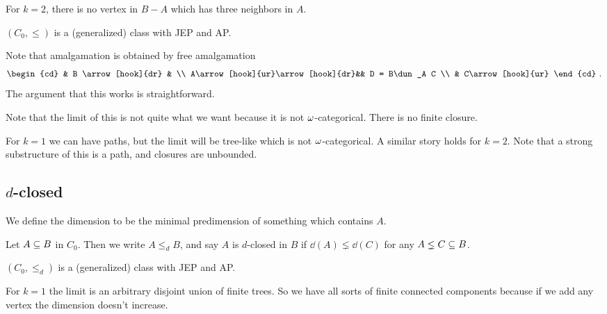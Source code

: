 \documentclass{amsart}
\begin{document}
\begin{exm}
For $k = 2$, there is no vertex in $B\minus A$
which has three neighbors in $A$.
\end{exm}

\begin{lem}
$\left( C_0 , \leq \right)$ is a (generalized) \Fraisse class with JEP and AP.
\end{lem}

Note that amalgamation is obtained by free amalgamation
\begin{equation}
\begin{cd}
& B \arrow[hook]{dr} & \\
A\arrow[hook]{ur}\arrow[hook]{dr}&&
D = B\dun_A C \\
& C\arrow[hook]{ur}
\end{cd} \ .
\end{equation}
The argument that this works is straightforward.

Note that the \Fraisse limit of this is not quite what we want because it is not
$\omega$-categorical. There is no finite closure.

\begin{exm}
For $k = 1$ we can have paths, but the limit will be tree-like which is not
$\omega$-categorical. A similar story holds for $k = 2$.
Note that a strong substructure of this is a path, and closures are unbounded.
\end{exm}

\subsection{$d$-closed}

We define the dimension to be the minimal predimension of something which contains $A$.

\begin{defn}
Let $A\subseteq B$ in $C_0$. Then we write $A\leq_d B$, and say $A$ is $d$-closed in $B$ if
$\dd\left( A \right)\lneq \dd\left( C \right)$ for any $A\lneq C \subseteq B$.
\end{defn}

\begin{lem}
$\left( C_0 , \leq_d \right)$ is a (generalized) \Fraisse class with JEP and AP.
\end{lem}

\begin{exm}
For $k = 1$ the \Fraisse limit is an arbitrary disjoint union of finite trees. So we have
all sorts of finite connected components because if we add any vertex the dimension
doesn't increase.
\end{exm}
\end{document}

